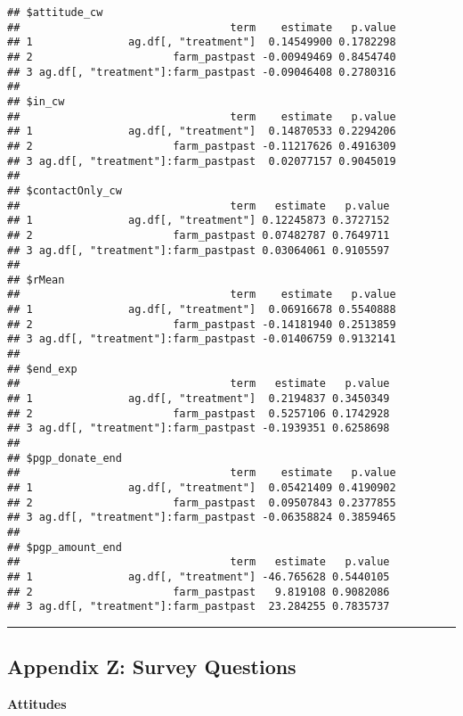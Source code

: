 \documentclass[
]{article}
\begin{document}
\begin{verbatim}
## $attitude_cw
##                                 term    estimate   p.value
## 1               ag.df[, "treatment"]  0.14549900 0.1782298
## 2                      farm_pastpast -0.00949469 0.8454740
## 3 ag.df[, "treatment"]:farm_pastpast -0.09046408 0.2780316
## 
## $in_cw
##                                 term    estimate   p.value
## 1               ag.df[, "treatment"]  0.14870533 0.2294206
## 2                      farm_pastpast -0.11217626 0.4916309
## 3 ag.df[, "treatment"]:farm_pastpast  0.02077157 0.9045019
## 
## $contactOnly_cw
##                                 term   estimate   p.value
## 1               ag.df[, "treatment"] 0.12245873 0.3727152
## 2                      farm_pastpast 0.07482787 0.7649711
## 3 ag.df[, "treatment"]:farm_pastpast 0.03064061 0.9105597
## 
## $rMean
##                                 term    estimate   p.value
## 1               ag.df[, "treatment"]  0.06916678 0.5540888
## 2                      farm_pastpast -0.14181940 0.2513859
## 3 ag.df[, "treatment"]:farm_pastpast -0.01406759 0.9132141
## 
## $end_exp
##                                 term   estimate   p.value
## 1               ag.df[, "treatment"]  0.2194837 0.3450349
## 2                      farm_pastpast  0.5257106 0.1742928
## 3 ag.df[, "treatment"]:farm_pastpast -0.1939351 0.6258698
## 
## $pgp_donate_end
##                                 term    estimate   p.value
## 1               ag.df[, "treatment"]  0.05421409 0.4190902
## 2                      farm_pastpast  0.09507843 0.2377855
## 3 ag.df[, "treatment"]:farm_pastpast -0.06358824 0.3859465
## 
## $pgp_amount_end
##                                 term   estimate   p.value
## 1               ag.df[, "treatment"] -46.765628 0.5440105
## 2                      farm_pastpast   9.819108 0.9082086
## 3 ag.df[, "treatment"]:farm_pastpast  23.284255 0.7835737
\end{verbatim}

\begin{center}\rule{0.5\linewidth}{0.5pt}\end{center}

\hypertarget{appendix-z-survey-questions}{%
\subsection{Appendix Z: Survey
Questions}\label{appendix-z-survey-questions}}

\textbf{Attitudes}
\end{document}
